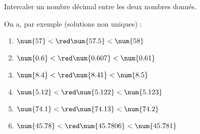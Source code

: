     Intercaler un nombre décimal entre les deux nombres donnés.

    {\color{red}On a, par exemple (solutions non uniques) :}

    \begin{enumerate}
        \item $\num{57   } < {\red \num{57.5   }} < \num{58    }$
        \item $\num{0.6  } < {\red \num{0.607  }} < \num{0.61  }$
        \item $\num{8.4  } < {\red \num{8.41   }} < \num{8.5   }$
        \item $\num{5.12 } < {\red \num{5.122  }} < \num{5.123 }$
        \item $\num{74.1 } < {\red \num{74.13  }} < \num{74.2  }$
        \item $\num{45.78} < {\red \num{45.7806}} < \num{45.781}$
    \end{enumerate}
